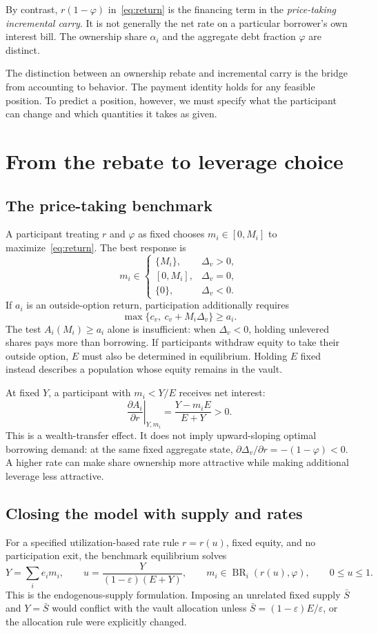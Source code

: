 \documentclass[12pt,oneside]{article}
\begin{document}
By contrast, $r(1-\varphi)$ in~\eqref{eq:return} is the financing term
in the \emph{price-taking incremental carry}. It is not generally the
net rate on a particular borrower's own interest bill. The ownership
share $\alpha_i$ and the aggregate debt fraction $\varphi$ are distinct.

The distinction between an ownership rebate and incremental carry
is the bridge from accounting to behavior. The payment identity holds
for any feasible position. To predict a position, however, we must
specify what the participant can change and which quantities it takes
as given.

\section{From the rebate to leverage choice}
\label{sec:equilibrium}
\subsection{The price-taking benchmark}
A participant treating $r$ and $\varphi$ as fixed chooses
$m_i\in[0,M_i]$ to maximize~\eqref{eq:return}. The best response is
\[
 m_i\in
 \begin{cases}
 \{M_i\},&\Delta_v>0,\\
 [0,M_i],&\Delta_v=0,\\
 \{0\},&\Delta_v<0.
 \end{cases}
\]
If $a_i$ is an outside-option return, participation additionally requires
\[
 \max\{c_v,\ c_v+M_i\Delta_v\}\geq a_i.
\]
The test $A_i(M_i)\geq a_i$ alone is insufficient: when
$\Delta_v<0$, holding unlevered shares pays more than borrowing. If
participants withdraw equity to take their outside option, $E$ must
also be determined in equilibrium. Holding $E$ fixed instead describes
a population whose equity remains in the vault.

At fixed $Y$, a participant with $m_i<Y/E$ receives net interest:
\[
 \left.\frac{\partial A_i}{\partial r}\right|_{Y,m_i}
 =\frac{Y-m_iE}{E+Y}>0.
\]
This is a wealth-transfer effect. It does not imply upward-sloping
optimal borrowing demand: at the same fixed aggregate state,
$\partial\Delta_v/\partial r=-(1-\varphi)<0$.
A higher rate can make share ownership more attractive while making
additional leverage less attractive.

\subsection{Closing the model with supply and rates}
For a specified utilization-based rate rule $r=r(u)$, fixed equity,
and no participation exit, the benchmark equilibrium solves
\[
 Y=\sum_i e_i m_i,\qquad
 u=\frac{Y}{(1-\varepsilon)(E+Y)},\qquad
 m_i\in\operatorname{BR}_i(r(u),\varphi),\qquad 0\leq u\leq1.
\]
This is the endogenous-supply formulation. Imposing an unrelated fixed
supply $\bar S$ and $Y=\bar S$ would conflict with the vault allocation
unless $\bar S=(1-\varepsilon)E/\varepsilon$, or the allocation rule
were explicitly changed.
\end{document}
